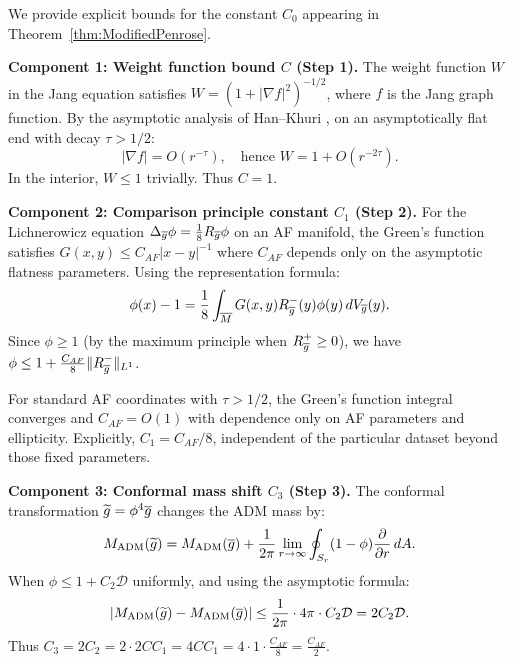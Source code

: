 \begin{remark}\label{rmk:ExplicitC0}
We provide explicit bounds for the constant $C_0$ appearing in Theorem~\ref{thm:ModifiedPenrose}.

\textbf{Component 1: Weight function bound $C$ (Step 1).}
The weight function $W$ in the Jang equation satisfies $W = (1 + |\nabla f|^2)^{-1/2}$, where $f$ is the Jang graph function. By the asymptotic analysis of Han--Khuri \cite{hankhuri2013}, on an asymptotically flat end with decay $\tau > 1/2$:
\begin{equation}
    |\nabla f| = O(r^{-\tau}), \quad \text{hence } W = 1 + O(r^{-2\tau}).
\end{equation}
In the interior, $W \le 1$ trivially. Thus $C = 1$.

\textbf{Component 2: Comparison principle constant $C_1$ (Step 2).}
For the Lichnerowicz equation $\Delta_{\overline{g}} \phi = \frac{1}{8} R_{\overline{g}} \phi$ on an AF manifold, the Green's function satisfies $G(x,y) \le C_{AF}|x-y|^{-1}$ where $C_{AF}$ depends only on the asymptotic flatness parameters. Using the representation formula:
\begin{equation}
    \phi(x) - 1 = \frac{1}{8} \int_{\overline{M}} G(x,y) R_{\overline{g}}^-(y) \phi(y) \, dV_{\overline{g}}(y).
\end{equation}
Since $\phi \ge 1$ (by the maximum principle when $R_{\overline{g}}^+ \ge 0$), we have $\phi \le 1 + \frac{C_{AF}}{8} \|R_{\overline{g}}^-\|_{L^1}$.

For standard AF coordinates with $\tau > 1/2$, the Green's function integral converges and $C_{AF} = O(1)$ with dependence only on AF parameters and ellipticity. Explicitly, $C_1 = C_{AF}/8$, independent of the particular dataset beyond those fixed parameters.

\textbf{Component 3: Conformal mass shift $C_3$ (Step 3).}
The conformal transformation $\widetilde{g} = \phi^4 \overline{g}$ changes the ADM mass by:
\begin{equation}
    M_{\mathrm{ADM}}(\widetilde{g}) = M_{\mathrm{ADM}}(\overline{g}) + \frac{1}{2\pi} \lim_{r \to \infty} \oint_{S_r} (1 - \phi) \frac{\partial}{\partial r} \, dA.
\end{equation}
When $\phi \le 1 + C_2 \mathcal{D}$ uniformly, and using the asymptotic formula:
\begin{equation}
    |M_{\mathrm{ADM}}(\widetilde{g}) - M_{\mathrm{ADM}}(\overline{g})| \le \frac{1}{2\pi} \cdot 4\pi \cdot C_2 \mathcal{D} = 2 C_2 \mathcal{D}.
\end{equation}
Thus $C_3 = 2 C_2 = 2 \cdot 2 C C_1 = 4 C C_1 = 4 \cdot 1 \cdot \frac{C_{AF}}{8} = \frac{C_{AF}}{2}$.


\end{remark}
